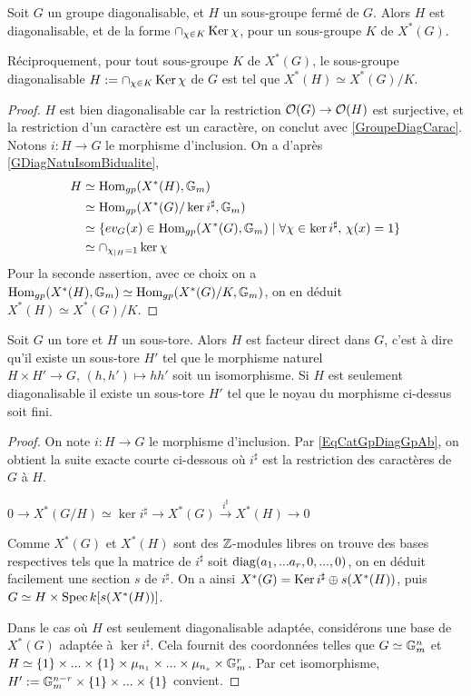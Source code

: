 \begin{prop}
Soit $G$ un groupe diagonalisable, et $H$ un sous-groupe fermé de $G$. Alors $H$ est diagonalisable, et de la forme $\cap_{\chi\in K}\operatorname{Ker}\chi$, pour un sous-groupe $K$ de $X^*(G)$. 

Réciproquement, pour tout sous-groupe $K$ de $X^*(G)$, le sous-groupe diagonalisable $H:=\cap_{\chi\in K}\operatorname{Ker}\chi$ de $G$ est tel que $X^*(H)\simeq X^*(G)/K$.
\end{prop}
\begin{proof}
$H$ est bien diagonalisable car la restriction $\mathcal{O}(G)\rightarrow \mathcal{O}(H)$ est surjective, et la restriction d'un caractère est un caractère, on conclut avec \ref{GroupeDiagCarac}. Notons $i:H\rightarrow G$ le morphisme d'inclusion. On a d'après \ref{GDiagNatuIsomBidualite}, 
\begin{equation}
\begin{split}
H & \simeq\operatorname{Hom}_{gp}(X^*(H),\mathbb{G}_m) \\
    & \simeq\operatorname{Hom}_{gp}(X^*(G)/\ker i^\sharp,\mathbb{G}_m)\\
    &\simeq\lbrace ev_G(x)\in\operatorname{Hom}_{gp}(X^*(G),\mathbb{G}_m)\mid\forall \chi\in\ker i^\sharp,\,\chi(x)=1\rbrace\\
    &\simeq\cap_{\chi_{|H}=1}\ker \chi
\end{split}
\end{equation}
Pour la seconde assertion, avec ce choix on a  $\operatorname{Hom}_{gp}(X^*(H),\mathbb{G}_m)\simeq\operatorname{Hom}_{gp}(X^*(G)/K,\mathbb{G}_m)$, on en déduit $X^*(H)\simeq X^*(G)/K$.
\end{proof}

\begin{prop}\label{GDiagSubtorusFacteurDirect}
Soit $G$ un tore et $H$ un sous-tore. Alors $H$ est facteur direct dans $G$, c'est à dire qu'il existe un sous-tore $H'$ tel que le morphisme naturel $H\times H'\rightarrow G,\, (h,h')\mapsto hh'$ soit un isomorphisme. Si $H$ est seulement diagonalisable il existe un sous-tore $H'$ tel que le noyau du morphisme ci-dessus soit fini.
\end{prop}
\begin{proof}
On note $i:H\rightarrow G$ le morphisme d'inclusion. Par \ref{EqCatGpDiagGpAb}, on obtient la suite exacte courte ci-dessous où $i^\sharp$ est la restriction des caractères de $
G$ à $H$.
\begin{center}
$0\rightarrow X^*(G/H)\simeq\ker i^\sharp\rightarrow X^*(G)\xrightarrow{i^\sharp} X^*(H)\rightarrow 0$
\end{center}
Comme $X^*(G)$ et $X^*(H)$ sont des $\mathbb{Z}$-modules libres on trouve des bases respectives tels que la matrice de $i^\sharp$ soit $\operatorname{diag}(a_1,...a_r,0,...,0)$, on en déduit facilement une section $s$ de $i^\sharp$. On a ainsi $X^*(G)=\operatorname{Ker} i^\sharp\oplus s(X^*(H))$, puis $G\simeq H\times \operatorname{Spec} k[s(X^*(H))]$.

Dans le cas où $H$ est seulement diagonalisable adaptée, considérons une base de $X^*(G)$ adaptée à $\ker i^\sharp$. Cela fournit des coordonnées telles que $G\simeq \mathbb{G}_m^n$ et $H\simeq \lbrace 1\rbrace\times...\times\lbrace 1\rbrace\times\mu_{n_1}\times...\times\mu_{n_s}\times\mathbb{G}_m^r$. Par cet isomorphisme, $H':=\mathbb{G}_m^{n-r}\times  \lbrace 1\rbrace\times...\times  \lbrace 1\rbrace$ convient.
\end{proof}

